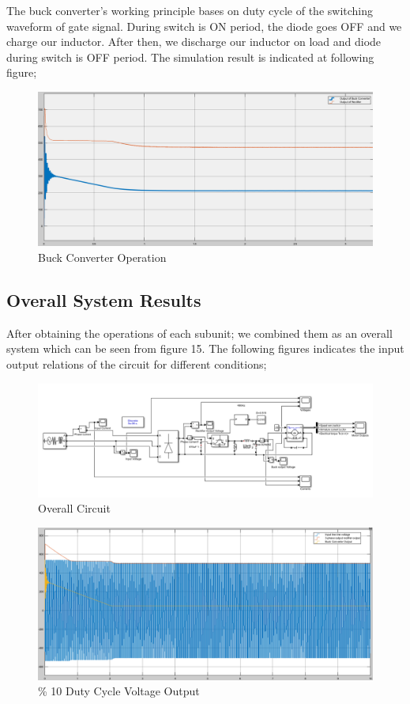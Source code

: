 \documentclass{article}
\begin{document}
\par The buck converter's working principle bases on duty cycle of the switching waveform of gate signal. During switch is ON period, the diode goes OFF and we charge our inductor. After then, we discharge our inductor on load and diode during switch is OFF period. The simulation result is indicated at following figure;

\begin{figure}[H]
\centering
\includegraphics[scale=0.25]{buckvoltage}
\caption{Buck Converter Operation}
\label{fig:members}
\end{figure}

\subsection{Overall System Results}
After obtaining the operations of each subunit; we combined them as an overall system which can be seen from figure 15. The following figures indicates the input output relations of the circuit for different conditions; 

\begin{figure}[H]
\centering
\includegraphics[scale=0.45]{ucfazdiyotbuck}
\caption{Overall Circuit}
\label{fig:members}
\end{figure}

\begin{figure}[H]
\centering
\includegraphics[scale=0.25]{voltagesnoktaonduty}
\caption{\% 10 Duty Cycle Voltage Output}
\label{fig:members}
\end{figure}
\end{document}
